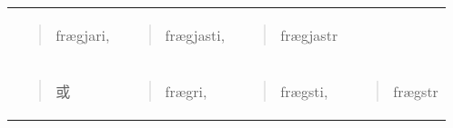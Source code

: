 \begin{longtable}{llll}
\begin{minipage}[t]{\linewidth}
                             \begin{quote}
      frægjari,
    \end{quote}
                           \end{minipage} & \begin{minipage}[t]{\linewidth}\raggedright
                                              \begin{quote}
      frægjasti,
    \end{quote}
                                            \end{minipage} & \begin{minipage}[t]{\linewidth}\raggedright
                                                               \begin{quote}
      frægjastr
    \end{quote}
                                                             \end{minipage}                                                                              \\
  \begin{minipage}[t]{\linewidth}\raggedright
    \begin{quote}
      或
    \end{quote}
  \end{minipage}         & \begin{minipage}[t]{\linewidth}\raggedright
                             \begin{quote}
      frægri,
    \end{quote}
                           \end{minipage} & \begin{minipage}[t]{\linewidth}\raggedright
                                              \begin{quote}
      frægsti,
    \end{quote}
                                            \end{minipage} & \begin{minipage}[t]{\linewidth}\raggedright
                                                               \begin{quote}
      frægstr
    \end{quote}
                                                             \end{minipage}                                                                              \\
\end{longtable}

